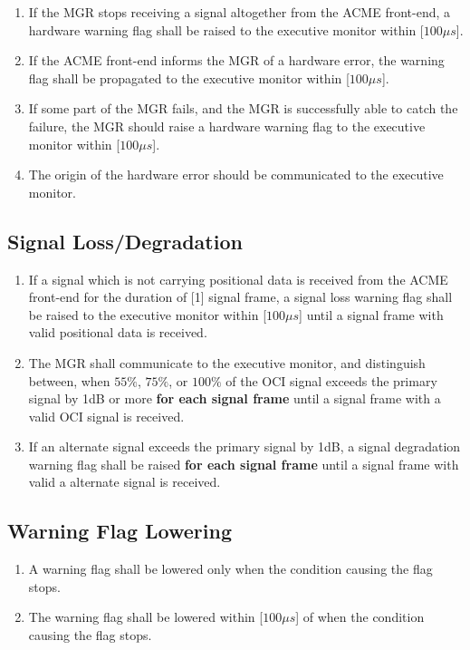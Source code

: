 \documentclass[11pt]{article}
\begin{document}
\begin{enumerate}

	\item If the MGR stops receiving a signal altogether from the ACME front-end, a hardware warning flag shall be raised to the executive monitor within [$100\mu s$].   

	\item If the ACME front-end informs the MGR of a hardware error, the warning flag shall be propagated to the executive monitor within [$100\mu s$].

	\item If some part of the MGR fails, and the MGR is successfully able to catch the failure, the MGR should raise a hardware warning flag to the executive monitor within [$100\mu s$].

	\item The origin of the hardware error should be communicated to the executive monitor.

\end{enumerate}

\subsection{Signal Loss/Degradation}\label{signal warning}

\begin{enumerate}

	\item If a signal which is not carrying positional data is received from the ACME front-end for the duration of [1] signal frame, a signal loss warning flag shall be raised to the executive monitor within [$100\mu s$] until a signal frame with valid positional data is received.

	\item \label{OCI} The MGR shall communicate to the executive monitor, and distinguish between, when $55\%$, $75\%$, or $100\%$ of the OCI signal exceeds the primary signal by 1dB or more \textbf{for each signal frame} until a signal frame with a valid OCI signal is received.

	\item \label{alternative} If an alternate signal exceeds the primary signal by 1dB, a signal degradation warning flag shall be raised \textbf{for each signal frame} until a signal frame with valid a alternate signal is received.

\end{enumerate}

\subsection{Warning Flag Lowering}

\begin{enumerate}

	\item A warning flag shall be lowered only when the condition causing the flag stops.

	\item The warning flag shall be lowered within [$100\mu s$] of when the condition causing the flag stops.

\end{enumerate}
\end{document}
